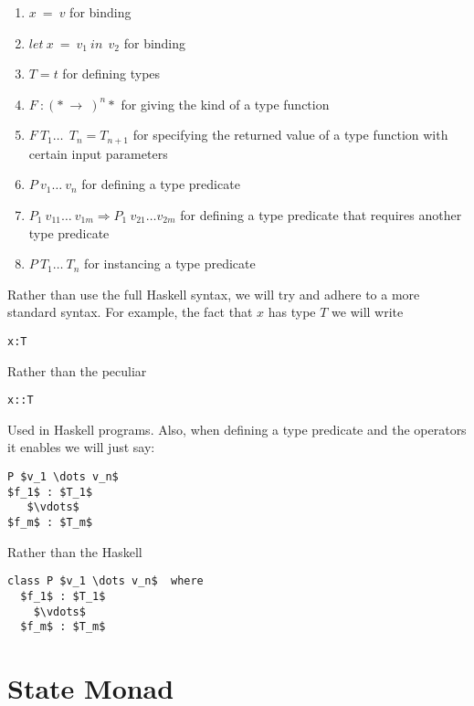 \documentclass[a4paper]{article}
\begin{document}
\begin{enumerate}
\item  $x\ =\ v$ for binding

\item  $let\ x\ =\ v_1\ in\ \ v_2$ for binding

\item  $T=t$ for defining types

\item  $F\ :{\left(*\ \to \ \right)}^n*$ for giving the kind of a type function

\item  $F\ T_1\dots \ \ T_n=T_{n+1}$ for specifying the returned value of a type function with certain input parameters

\item  $P\ v_1\dots \ v_n$ for defining a type predicate

\item  $P_1\ v_{11}\dots \ v_{1m}\Rightarrow P_1\ v_{21}\dots v_{2m}$ for defining a type predicate that requires another type predicate

\item  $P\ T_1\dots \ T_n$ for instancing a type predicate
\end{enumerate}

 Rather than use the full Haskell syntax, we will try and adhere to a more standard syntax. For example, the fact that $x$ has type $T$ we will write

\begin{lstlisting}
x:T
\end{lstlisting}

Rather than the peculiar

\begin{lstlisting}
x::T
\end{lstlisting}

Used in Haskell programs. Also, when defining a type predicate and the operators it enables we will just say:

\begin{lstlisting}
P $v_1 \dots v_n$
$f_1$ : $T_1$
   $\vdots$
$f_m$ : $T_m$
\end{lstlisting}

Rather than the Haskell

\begin{lstlisting}
class P $v_1 \dots v_n$  where
  $f_1$ : $T_1$
    $\vdots$
  $f_m$ : $T_m$
\end{lstlisting}

\section{State Monad}
\end{document}
